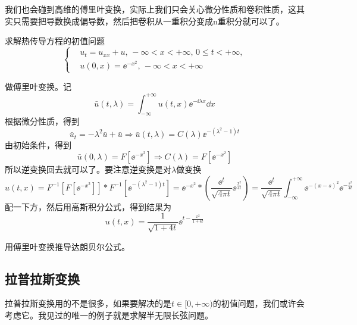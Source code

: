 我们也会碰到高维的傅里叶变换，实际上我们只会关心微分性质和卷积性质，这其实只需要把导数换成偏导数，然后把卷积从一重积分变成n重积分就可以了。
\begin{problembox}
    \begin{example}
        求解热传导方程的初值问题
        \begin{equation*}
            \left\{
                \begin{aligned}
                    &u_t = u_{xx} + u,\, -\infty < x < +\infty,\, 0 \leq t < +\infty,\\
                    &u\left(0, x\right) = \ee^{-x^2},\, -\infty < x < +\infty
                \end{aligned}
            \right.
        \end{equation*}
    \end{example}
    \begin{solution}
        做傅里叶变换。记
        \[\bar{u}\left(t, \lambda\right) = \int_{-\infty}^{+\infty} u\left(t, x\right) \ee^{- \ii \lambda x} \dd{x}\]
        根据微分性质，得到
        \[\bar{u}_t = -\lambda^2 \bar{u} + \bar{u} \Rightarrow \bar{u}\left(t, \lambda\right) = C\left(\lambda\right) \ee^{-\left(\lambda^2 - 1\right)t}\]
        由初始条件，得到
        \[\bar{u}\left(0, \lambda\right) = F\left[\ee^{-x^2}\right] \Rightarrow C\left(\lambda\right) = F\left[\ee^{-x^2}\right]\]
        所以逆变换回去就可以了。要注意逆变换是对$\lambda$做变换
        \[u\left(t, x\right) = F^{-1}\left[F\left[\ee^{-x^2}\right]\right] * F^{-1}\left[\ee^{-\left(\lambda^2 - 1\right)t}\right] = \ee^{-x^2} * \left(\frac{\ee^t}{\sqrt{4 \pi t}} \ee^{\frac{x^2}{4t}}\right) = \frac{\ee^{t}}{\sqrt{4 \pi t}}\int_{-\infty}^{+\infty} \ee^{-\left(x - s\right)^2} \ee^{-\frac{s^2}{4t}}\]
        配一下方，然后用高斯积分公式，得到结果为
        \[u\left(t, x\right) = \frac{1}{\sqrt{1 + 4t}} \ee^{t - \frac{x^2}{1 + 4t}}\]
    \end{solution}
\end{problembox}
\begin{problembox}
    \begin{exercise}
        用傅里叶变换推导达朗贝尔公式。
    \end{exercise}
\end{problembox}

\subsection{拉普拉斯变换}
拉普拉斯变换用的不是很多，如果要解决的是$t \in [0, +\infty)$的初值问题，我们或许会考虑它。我见过的唯一的例子就是求解半无限长弦问题。

